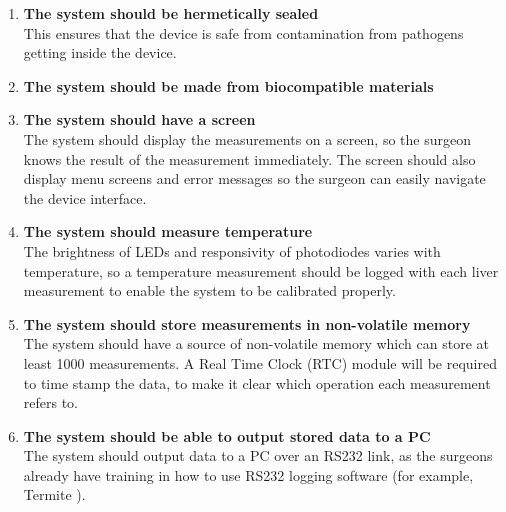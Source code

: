 \begin{enumerate}
\item \label{req: seal} \textbf{The system should be hermetically sealed}\\
This ensures that the device is safe from contamination from pathogens getting inside the device.

\item \label{req: biocompatible} \textbf{The system should be made from biocompatible materials}\\




\item \label{req: screen} \textbf{The system should have a screen}\\
The system should display the measurements on a screen, so the surgeon knows the result of the measurement immediately. The screen should also display menu screens and error messages so the surgeon can easily navigate the device interface.

\item \label{req: temperature} \textbf{The system should measure temperature}\\
The brightness of LEDs and responsivity of photodiodes varies with temperature, so a temperature measurement should be logged with each liver measurement to enable the system to be calibrated properly.

\item \label{req: memory} \textbf{The system should store measurements in non-volatile memory}\\
The system should have a source of non-volatile memory which can store at least 1000 measurements. A Real Time Clock (RTC) module will be required to time stamp the data, to make it clear which operation each measurement refers to.

\item \label{req: rs232} \textbf{The system should be able to output stored data to a PC}\\
The system should output data to a PC over an RS232 link, as the surgeons already have training in how to use RS232 logging software (for example, Termite \cite{termite}).


\end{enumerate}